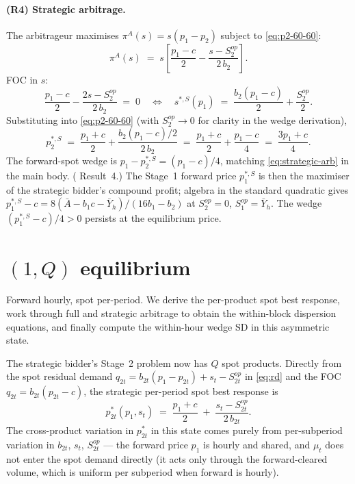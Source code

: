 \documentclass[11pt]{article}
\begin{document}
\paragraph{(R4) Strategic arbitrage.} The arbitrageur maximises $\pi^A(s) = s(p_1 - p_2)$ subject to \eqref{eq:p2-60-60}:
\[
\pi^A(s) \;=\; s\!\left[\frac{p_1 - c}{2} - \frac{s - S^{op}_2}{2\, b_2}\right].
\]
FOC in $s$:
\[
\frac{p_1 - c}{2} - \frac{2 s - S^{op}_2}{2\, b_2} \;=\; 0
\quad\Longleftrightarrow\quad
s^{*,S}(p_1) \;=\; \frac{b_2 (p_1 - c)}{2} + \frac{S^{op}_2}{2}.
\]
Substituting into \eqref{eq:p2-60-60} (with $S^{op}_2 \to 0$ for clarity in the wedge derivation),
\begin{equation}
p_2^{*,S} \;=\; \frac{p_1 + c}{2} + \frac{b_2(p_1 - c)/2}{2\, b_2} \;=\; \frac{p_1 + c}{2} + \frac{p_1 - c}{4} \;=\; \frac{3 p_1 + c}{4}.
\label{eq:p2-strategic-derived}
\end{equation}
The forward-spot wedge is $p_1 - p_2^{*,S} = (p_1 - c)/4$, matching \eqref{eq:strategic-arb} in the main body. (\citeauthor{ito_reguant_2016} Result~4.) The Stage~1 forward price $p_1^{*,S}$ is then the maximiser of the strategic bidder's compound profit; algebra in the standard quadratic gives $p_1^{*,S} - c = 8 (\bar A - b_1 c - \bar Y_h)/(16 b_1 - b_2)$ at $S^{op}_2 = 0$, $S^{op}_1 = \bar Y_h$. The wedge $(p_1^{*,S} - c)/4 > 0$ persists at the equilibrium price.

\section{$(1,Q)$ equilibrium}\label{app:state-60-15}

Forward hourly, spot per-period. We derive the per-product spot best response, work through full and strategic arbitrage to obtain the within-block dispersion equations, and finally compute the within-hour wedge SD in this asymmetric state.

The strategic bidder's Stage~2 problem now has $Q$ spot products. Directly from the spot residual demand $q_{2t} = b_{2t}(p_1 - p_{2t}) + s_t - S^{op}_{2t}$ in \eqref{eq:rd} and the FOC $q_{2t} = b_{2t}(p_{2t}-c)$, the strategic per-period spot best response is
\begin{equation}
p_{2t}^*(p_1, s_t) \;=\; \frac{p_1 + c}{2} \;+\; \frac{s_t - S^{op}_{2t}}{2\, b_{2t}}.
\label{eq:p2-60-15-foc}
\end{equation}
The cross-product variation in $p_{2t}^*$ in this state comes purely from per-subperiod variation in $b_{2t}$, $s_t$, $S^{op}_{2t}$ --- the forward price $p_1$ is hourly and shared, and $\mu_t$ does not enter the spot demand directly (it acts only through the forward-cleared volume, which is uniform per subperiod when forward is hourly).
\end{document}
